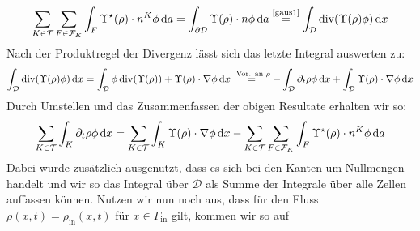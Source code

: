 \begin{align*}
	\sum_{K\in \mathcal{T}} \sum_{F \in \mathcal{F}_K} \int_F \Upsilon^{\star}(\rho) \cdot n^K \phi \, \mathrm{d} a = \int_{\partial \mathcal{D}} \Upsilon(\rho) \cdot n \phi \, \mathrm{d} a \stackrel{\text{\ref{gaus1}}}{=} \int_{\mathcal{D}} \operatorname{div} (\Upsilon(\rho)\phi) \, \mathrm{d} x
\end{align*}
Nach der Produktregel der Divergenz lässt sich das letzte Integral auswerten zu:
\begin{align*}
	 \int_{\mathcal{D}} \operatorname{div} (\Upsilon(\rho)\phi) \, \mathrm{d} x = \int_{\mathcal{D}} \phi \operatorname{div}(\Upsilon(\rho)) + \Upsilon(\rho) \cdot \nabla \phi \, \mathrm{d} x \stackrel{\text{ Vor. an }\rho }{=} - \int_{\mathcal{D}} \partial_t \rho \phi \, \mathrm{d} x + \int_{\mathcal{D}} \Upsilon(\rho) \cdot \nabla \phi \, \mathrm{d} x
\end{align*}
Durch Umstellen und das Zusammenfassen der obigen Resultate erhalten wir so: 
\begin{align*}
	\sum_{K \in \mathcal{T}} \int_K \partial_t \rho  \phi \, \mathrm{d} x = \sum_{K \in \mathcal{T}} \int_K \Upsilon(\rho ) \cdot \nabla \phi \, \mathrm{d} x - 	\sum_{K\in \mathcal{T}} \sum_{F \in \mathcal{F}_K} \int_F \Upsilon^{\star}(\rho) \cdot n^K \phi \, \mathrm{d} a
\end{align*}
Dabei wurde zusätzlich ausgenutzt, dass es sich bei den Kanten um Nullmengen handelt und wir so das Integral über $ \mathcal{D} $ als Summe der Integrale über alle Zellen auffassen können. Nutzen wir nun noch aus, dass für den Fluss  $\rho(x,t) = \rho_{\text{in}}(x,t)$ für $ x \in \Gamma_{\text{in}} $ gilt, kommen wir so auf 

